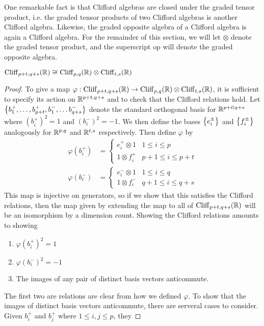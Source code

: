 One remarkable fact is that Clifford algebras are closed under the graded
tensor product, i.e. the graded tensor products of two Clifford algebras is
another Clifford algebra. Likewise, the graded opposite algebra of a Clifford
algebra is again a Clifford algebra. For the remainder of this section,
we will let $\otimes$ denote the graded tensor product, and the superscript
$\text{op}$ will denote the graded opposite algebra.
%
\begin{thm}
$\operatorname{Cliff}_{p+t,q+s}(\mathbb{R}) \cong \operatorname{Cliff}_{p,q}(\mathbb{R}) \otimes \operatorname{Cliff}_{t,s}(\mathbb{R})$
\end{thm}
%
\begin{proof}
To give a map $\varphi : \operatorname{Cliff}_{p+t,q+s}(\mathbb{R}) \to \operatorname{Cliff}_{p,q}(\mathbb{R}) \otimes
\operatorname{Cliff}_{t,s}(\mathbb{R})$, it is sufficient to specify its action on $\mathbb{R}^{p+t,q+s}$ and
to check that the Clifford relations hold. Let
$\left\lbrace b_1^+,\ldots, b_{p+t}^+, b_1^-, \ldots b_{q+s}^- \right\rbrace$ denote the standard
orthogonal basis for $\mathbb{R}^{p+t|q+s}$ where $(b_i^+)^2 = 1$ and $(b_i^-)^2 = -1$.
We then define the bases $\left\lbrace e_i^\pm \right\rbrace$ and $\left\lbrace f_i^\pm \right\rbrace$ analogously for
$\mathbb{R}^{p,q}$ and $\mathbb{R}^{t,s}$ respectively. Then define $\varphi$ by
%
\begin{align*}
\varphi(b_i^+) &= \begin{cases}
e_i^+ \otimes 1 & 1 \leq i \leq p \\
1 \otimes f_i^+ & p+1 \leq i \leq p+t
\end{cases} \\
\varphi(b_i^-) &= \begin{cases}
e_i^- \otimes 1 & 1 \leq i \leq q \\
1 \otimes f_i^- & q+1 \leq i \leq q+s
\end{cases}
\end{align*}
%
This map is injective on generators, so if we show that this satisfies the
Clifford relations, then the map given by extending the map to all of
$\operatorname{Cliff}_{p+t,q+s}(\mathbb{R})$ will be an isomorphism by a dimension count. Showing
the Clifford relations amounts to showing
%
\begin{enumerate}
  \item $\varphi(b_i^+)^2 = 1$
  \item $\varphi(b_i^-)^2 = -1$
  \item The images of any pair of distinct basis vectors anticommute.
\end{enumerate}
%
The first two are relations are clear from how we defined $\varphi$. To show
that the images of distinct basis vectors anticommute, there are serveral
cases to consider. Given $b_i^+$ and $b_j^+$ where $1 \leq i,j \leq p$, they

\end{proof}
